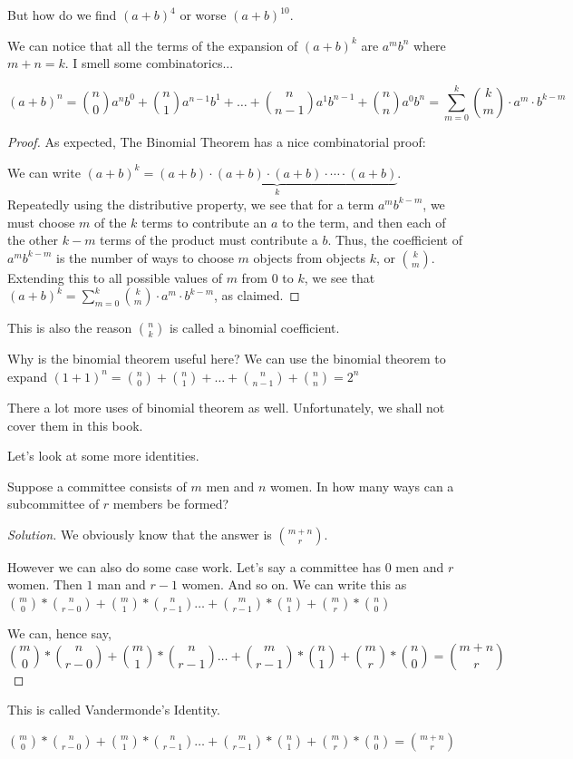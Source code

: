 But how do we find $(a+b)^4$ or worse $(a+b)^{10}$. \par
We can notice that all the terms of the expansion of $(a+b)^k$ are $a^mb^n$ where $m+n=k$. 
I smell some combinatorics...\par
\begin{theorem}
    \[(a+b)^n = \binom{n}{0}a^{n}b^0+\binom{n}{1}a^{n-1}b^1+\dots+
    \binom{n}{n-1}a^{1}b^{n-1}+\binom{n}{n}a^{0}b^{n} = 
    \sum_{m=0}^{k}{\binom{k}{m}}\cdot a^m\cdot b^{k-m}\]
\end{theorem}
\begin{proof}
    As expected, The Binomial Theorem has a nice combinatorial proof:\par
We can write $(a+b)^k=\underbrace{ (a+b)\cdot(a+b)\cdot(a+b)\cdot\cdots\cdot(a+b) }_{k}$. 
Repeatedly using the distributive property, we see that for a term $a^m b^{k-m}$, we must 
choose $m$ of the $k$ terms to contribute an $a$ to the term, and then each of the other $k-m$ terms 
of the product must contribute a $b$. Thus, the coefficient of $a^m b^{k-m}$ is the number of ways to 
choose $m$ objects from objects $k$, or $\binom{k}{m}$. Extending this to all possible values of $m$ 
from $0$ to $k$, we see that $(a+b)^k = \sum_{m=0}^{k}{\binom{k}{m}}\cdot a^m\cdot b^{k-m}$, as claimed.
\end{proof}
This is also the reason $\binom{n}{k}$ is called a binomial coefficient.\par
Why is the binomial theorem useful here? We can use the binomial theorem to 
expand $(1+1)^n=\binom{n}{0}+\binom{n}{1}+\dots+\binom{n}{n-1}+\binom{n}{n}=2^n$\par
There a lot more uses of binomial theorem as well. Unfortunately, we shall not cover them in this book.\par
Let's look at some more identities.\par
\begin{example}
     Suppose a committee consists of $m$ men and $n$ women. In how many ways can a 
     subcommittee of $r$ members be formed?
\end{example}
\begin{proof}
    [Solution]
    We obviously know that the answer is $\binom{m+n}{r}$. \par
    However we can also do some case work. Let's say a committee has $0$ men 
    and $r$ women. Then $1$ man and $r-1$ women. And so on. We can write 
    this as $\binom{m}{0}*\binom{n}{r-0} + \binom{m}{1}*\binom{n}{r-1} 
    \dots +\binom{m}{r-1}*\binom{n}{1}+\binom{m}{r}*\binom{n}{0}$\par
    We can, hence say, 
    \[\binom{m}{0}*\binom{n}{r-0} + \binom{m}{1}*\binom{n}{r-1} 
    \dots +\binom{m}{r-1}*\binom{n}{1}+\binom{m}{r}*\binom{n}{0}=\binom{m+n}{r}\]
    \end{proof}
This is called Vandermonde’s Identity.
\begin{theorem}
    $\binom{m}{0}*\binom{n}{r-0} + \binom{m}{1}*\binom{n}{r-1} \dots +
    \binom{m}{r-1}*\binom{n}{1}+\binom{m}{r}*\binom{n}{0}=\binom{m+n}{r}$
\end{theorem}
